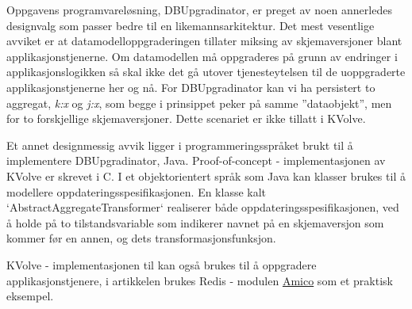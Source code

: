 Oppgavens programvareløsning, DBUpgradinator, er preget av noen annerledes designvalg som passer bedre til en likemannsarkitektur. Det mest vesentlige avviket er at datamodelloppgraderingen tillater miksing av skjemaversjoner blant applikasjonstjenerne. Om datamodellen må oppgraderes på grunn av endringer i applikasjonslogikken så skal ikke det gå utover tjenesteytelsen til de uoppgraderte applikasjonstjenerne her og nå. For DBUpgradinator kan vi ha persistert to aggregat, \emph{k:x} og \emph{j:x}, som begge i prinsippet peker på samme ''dataobjekt'', men for to forskjellige skjemaversjoner. Dette scenariet er ikke tillatt i KVolve.

Et annet designmessig avvik ligger i programmeringsspråket brukt til å implementere DBUpgradinator, Java. Proof-of-concept - implementasjonen av KVolve er skrevet i C. I et objektorientert språk som Java kan klasser brukes til å modellere oppdateringsspesifikasjonen. En klasse kalt `AbstractAggregateTransformer` realiserer både oppdateringsspesifikasjonen, ved å holde på to tilstandsvariable som indikerer navnet på en skjemaversjon som kommer før en annen, og dets transformasjonsfunksjon.

KVolve - implementasjonen til \cite{saur2016} kan også brukes til å oppgradere applikasjonstjenere, i artikkelen brukes Redis - modulen \underline{Amico} som et praktisk eksempel.
